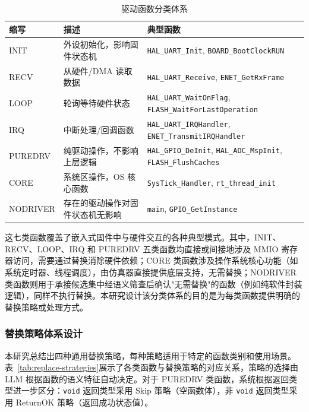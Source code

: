\begin{table}[htbp]
\centering
\caption{驱动函数分类体系}
\label{tab:function-categories}
\footnotesize
\setlength{\tabcolsep}{4pt}
\begin{tabular}{@{}llp{6.6cm}@{}}
\toprule
\textbf{缩写} & \textbf{描述} & \textbf{典型函数} \\
\midrule
INIT & 外设初始化，影响固件状态机 & \texttt{HAL\_UART\_Init}, \texttt{BOARD\_BootClockRUN} \\
RECV & 从硬件/DMA 读取数据 & \texttt{HAL\_UART\_Receive}, \texttt{ENET\_GetRxFrame} \\
LOOP & 轮询等待硬件状态 & \texttt{HAL\_UART\_WaitOnFlag}, \texttt{FLASH\_WaitForLastOperation} \\
IRQ & 中断处理/回调函数 & \texttt{HAL\_UART\_IRQHandler}, \texttt{ENET\_TransmitIRQHandler} \\
PUREDRV & 纯驱动操作，不影响上层逻辑 & \texttt{HAL\_GPIO\_DeInit}, \texttt{HAL\_ADC\_MspInit}, \texttt{FLASH\_FlushCaches} \\
\midrule
CORE & 系统区操作，OS 核心函数 & \texttt{SysTick\_Handler}, \texttt{rt\_thread\_init} \\
NODRIVER & 存在的驱动操作对固件状态机无影响 & \texttt{main}, \texttt{GPIO\_GetInstance} \\
\bottomrule
\end{tabular}
\end{table}

这七类函数覆盖了嵌入式固件中与硬件交互的各种典型模式。其中，INIT、RECV、LOOP、IRQ 和 PUREDRV 五类函数均直接或间接地涉及 MMIO 寄存器访问，需要通过替换消除硬件依赖；CORE 类函数涉及操作系统核心功能（如系统定时器、线程调度），由仿真器直接提供底层支持，无需替换；NODRIVER 类函数则用于承接候选集中经语义筛查后确认"无需替换"的函数（例如纯软件封装逻辑），同样不执行替换。本研究设计该分类体系的目的是为每类函数提供明确的替换策略或处理方式。

\subsubsection{替换策略体系设计}

本研究总结出四种通用替换策略，每种策略适用于特定的函数类别和使用场景。表~\ref{tab:replace-strategies}展示了各类函数与替换策略的对应关系，策略的选择由 LLM 根据函数的语义特征自动决定。对于 PUREDRV 类函数，系统根据返回类型进一步区分：\texttt{void} 返回类型采用 Skip 策略（空函数体），非 \texttt{void} 返回类型采用 ReturnOK 策略（返回成功状态值）。


